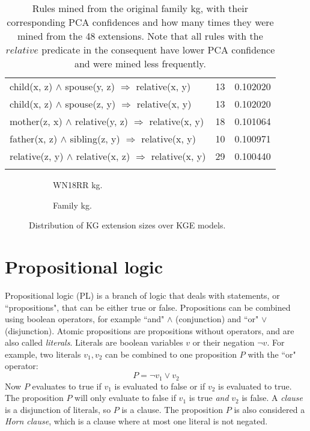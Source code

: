 \begin{longtable}{lrr}
     child(x, z) $\wedge$ spouse(y, z)   $\Rightarrow$ relative(x, y) &           13 &        0.102020 \\
     child(x, z) $\wedge$ spouse(z, y)   $\Rightarrow$ relative(x, y) &           13 &        0.102020 \\
  mother(z, x) $\wedge$ relative(y, z)   $\Rightarrow$ relative(x, y) &           18 &        0.101064 \\
   father(x, z) $\wedge$ sibling(z, y)   $\Rightarrow$ relative(x, y) &           10 &        0.100971 \\
relative(z, y) $\wedge$ relative(x, z)   $\Rightarrow$ relative(x, y) &           29 &        0.100440 \\
\bottomrule
\caption[Rules mined from the original family KG]{Rules mined from the original family \gls{kg}, with their corresponding PCA confidences and how many times they were mined from the 48 extensions. Note that all rules with the $relative$ predicate in the consequent have lower PCA confidence and were mined less frequently.}
\label{family_original_rules_table_PCA}
\end{longtable}


\begin{figure}[htb]
\centering
\begin{subfigure}{.5\textwidth}
  \centering
  
  \caption{WN18RR \gls{kg}.}
  \label{fig:model_extension_wn18rr_boxplot_sub}
\end{subfigure}%
\begin{subfigure}{.5\textwidth}
  \centering
  
  \caption{Family \gls{kg}.}
  \label{fig:model_extension_family_boxplot_sub}
\end{subfigure}
\caption{Distribution of KG extension sizes over KGE models.}
\label{model_extensions_boxplot}
\end{figure}

\chapter{Propositional logic}
\label{propositional_logic}
Propositional logic (PL) is a branch of logic that deals with statements, or ``propositions", that can be either true or false. Propositions can be combined using boolean operators, for example ``and" $\wedge$ (conjunction) and ``or" $\vee$ (disjunction). Atomic propositions are propositions without operators, and are also called \textit{literals}. Literals are boolean variables $v$ or their negation $\neg v$. For example, two literals $v_1, v_2$ can be combined to one proposition $P$ with the ``or" operator:
\[P = \neg v_1 \vee v_2\]
Now $P$ evaluates to true if $v_1$ is evaluated to false or if $v_2$ is evaluated to true. The proposition $P$ will only evaluate to false if $v_1$ is true \textit{and} $v_2$ is false. A \textit{clause} is a disjunction of literals, so $P$ is a clause. The proposition $P$ is also considered a \textit{Horn clause}, which is a clause where at most one literal is not negated. 

